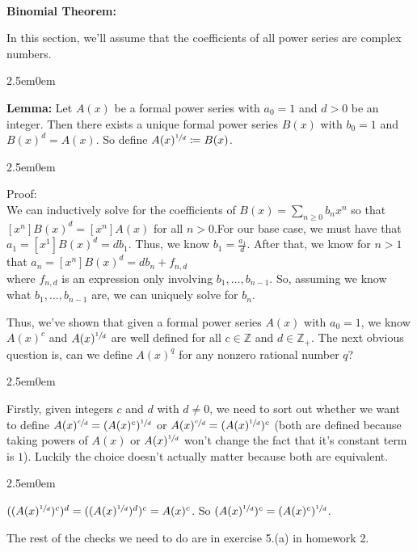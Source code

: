 \documentclass{book}
\newcommand{\hTwo}{%
\color{MidnightBlue}%
   \fontsize{13}{15}\selectfont%
}
\newcommand{\hThree}{%
   \color{PineGreen!85!Orange}
   \fontsize{12}{14}\selectfont%
}
\newenvironment{myIndent}{%
   \begin{adjustwidth}{2.5em}{0em}%
}{%
   \end{adjustwidth}%
}
\newcommand{\blab}[1]{\textbf{#1}}
\newcommand{\mySepTwo}[1][.]{%
   {\noindent\color{#1}{\rule{6.5in}{0.5mm}}}\\%
}
\newcommand{\retTwo}{\hfill\bigbreak}
\begin{document}
\mySepTwo

\blab{Binomial Theorem:}

In this section, we'll assume that the coefficients of all power series are complex numbers.\retTwo

\begin{myIndent}\hTwo
   \blab{Lemma:} Let $A(x)$ be a formal power series with $a_0 = 1$ and $d > 0$ be an integer. Then there exists a unique formal power series $B(x)$ with $b_0 = 1$ and $B(x)^d = A(x)$. So define $A(x)^{\sfrac{1}{d}} \coloneq B(x)$.
   \begin{myIndent}\hThree
      Proof:\\
      We can inductively solve for the coefficients of $B(x) = \sum\limits_{n \geq 0}b_nx^n$ so that\\ [-8pt] $[x^n]B(x)^d = [x^n]A(x)$ for all $n > 0$.\retTwo For our base case, we must have that $a_1 = [x^1]B(x)^d = db_1$. Thus, we know $b_1 = \frac{a_1}{d}$. After that, we know for $n > 1$ that $a_n = [x^n]B(x)^d = db_n + f_{n, d}$\\ [2pt] where $f_{n, d}$ is an expression only involving $b_1, \ldots, b_{n-1}$. So, assuming we know\\ what $b_1, \ldots, b_{n-1}$ are, we can uniquely solve for $b_n$.\retTwo
   \end{myIndent}
\end{myIndent}

Thus, we've shown that given a formal power series $A(x)$ with $a_0 = 1$, we know $A(x)^c$ and $A(x)^{\sfrac{1}{d}}$ are well defined for all $c \in \mathbb{Z}$ and $d \in \mathbb{Z}_+$. The next obvious question is, can we define $A(x)^q$ for any nonzero rational number $q$?

\begin{myIndent}\hTwo
   Firstly, given integers $c$ and $d$ with $d \neq 0$, we need to sort out whether we want to define $A(x)^{\sfrac{c}{d}} = (A(x)^c)^{\sfrac{1}{d}}$ or $A(x)^{\sfrac{c}{d}} = (A(x)^{\sfrac{1}{d}})^{c}$ (both are defined because taking powers of $A(x)$ or $A(x)^{\sfrac{1}{d}}$ won't change the fact that it's constant term is $1$). Luckily the choice doesn't actually matter because both are equivalent.\\
   
   \begin{myIndent}\hThree
      $((A(x)^{\sfrac{1}{d}})^c)^d = ((A(x)^{\sfrac{1}{d}})^d)^c = A(x)^c$. So $(A(x)^{\sfrac{1}{d}})^c = (A(x)^c)^{\sfrac{1}{d}}$.\retTwo
   \end{myIndent}

   The rest of the checks we need to do are in exercise 5.(a) in homework 2.\retTwo
\end{myIndent}
\end{document}
